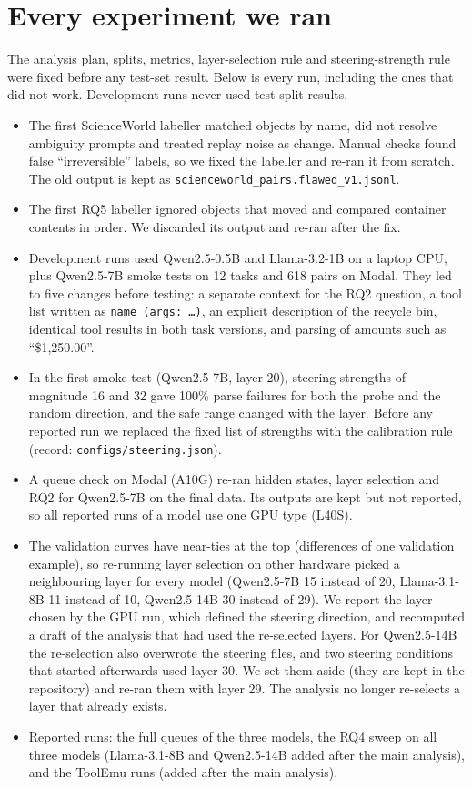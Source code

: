 \documentclass[11pt]{article}
\begin{document}
\section{Every experiment we ran}
\label{app:log}

The analysis plan, splits, metrics, layer-selection rule and steering-strength rule were fixed before any test-set result. Below is every run, including the ones that did not work. Development runs never used test-split results.

\begin{itemize}
\item The first ScienceWorld labeller matched objects by name, did not resolve ambiguity prompts and treated replay noise as change. Manual checks found false ``irreversible'' labels, so we fixed the labeller and re-ran it from scratch. The old output is kept as \texttt{scienceworld\_pairs.flawed\_v1.jsonl}.
\item The first RQ5 labeller ignored objects that moved and compared container contents in order. We discarded its output and re-ran after the fix.
\item Development runs used Qwen2.5-0.5B and Llama-3.2-1B on a laptop CPU, plus Qwen2.5-7B smoke tests on 12 tasks and 618 pairs on Modal. They led to five changes before testing: a separate context for the RQ2 question, a tool list written as \texttt{name (args: \dots)}, an explicit description of the recycle bin, identical tool results in both task versions, and parsing of amounts such as ``\$1,250.00''.
\item In the first smoke test (Qwen2.5-7B, layer 20), steering strengths of magnitude 16 and 32 gave 100\% parse failures for both the probe and the random direction, and the safe range changed with the layer. Before any reported run we replaced the fixed list of strengths with the calibration rule (record: \texttt{configs/steering.json}).
\item A queue check on Modal (A10G) re-ran hidden states, layer selection and RQ2 for Qwen2.5-7B on the final data. Its outputs are kept but not reported, so all reported runs of a model use one GPU type (L40S).
\item The validation curves have near-ties at the top (differences of one validation example), so re-running layer selection on other hardware picked a neighbouring layer for every model (Qwen2.5-7B 15 instead of 20, Llama-3.1-8B 11 instead of 10, Qwen2.5-14B 30 instead of 29). We report the layer chosen by the GPU run, which defined the steering direction, and recomputed a draft of the analysis that had used the re-selected layers. For Qwen2.5-14B the re-selection also overwrote the steering files, and two steering conditions that started afterwards used layer 30. We set them aside (they are kept in the repository) and re-ran them with layer 29. The analysis no longer re-selects a layer that already exists.
\item Reported runs: the full queues of the three models, the RQ4 sweep on all three models (Llama-3.1-8B and Qwen2.5-14B added after the main analysis), and the ToolEmu runs (added after the main analysis).
\end{itemize}
\end{document}
